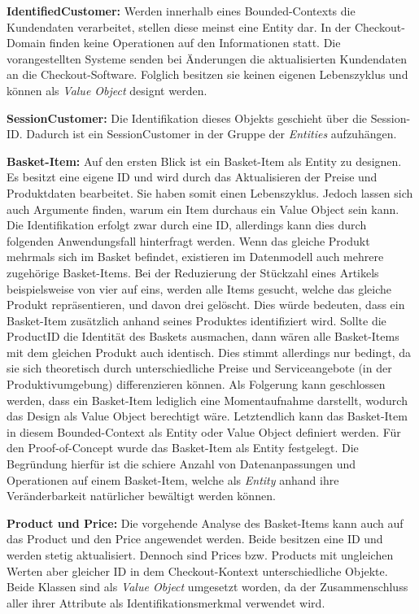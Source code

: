 \textbf{IdentifiedCustomer: } {Werden innerhalb eines Bounded-Contexts die Kundendaten verarbeitet, stellen diese meinst eine Entity dar. In der Checkout-Domain finden keine Operationen auf den Informationen statt. Die vorangestellten Systeme senden bei Änderungen die aktualisierten Kundendaten an die Checkout-Software. Folglich besitzen sie keinen eigenen Lebenszyklus und können als \emph{Value Object} designt werden.}

\textbf{SessionCustomer: } {Die Identifikation dieses Objekts geschieht über die Session-ID. Dadurch ist ein SessionCustomer in der Gruppe der \emph{Entities} aufzuhängen. }

\textbf{Basket-Item: } {Auf den ersten Blick ist ein Basket-Item als Entity zu designen. Es besitzt eine eigene ID und wird durch das Aktualisieren der Preise und Produktdaten bearbeitet. Sie haben somit einen Lebenszyklus. Jedoch lassen sich auch Argumente finden, warum ein Item durchaus ein Value Object sein kann. Die Identifikation erfolgt zwar durch eine ID, allerdings kann dies durch folgenden Anwendungsfall hinterfragt werden. Wenn das gleiche Produkt mehrmals sich im Basket befindet, existieren im Datenmodell auch mehrere zugehörige Basket-Items. Bei der Reduzierung der Stückzahl eines Artikels beispielsweise von vier auf eins, werden alle Items gesucht, welche das gleiche Produkt repräsentieren, und davon drei gelöscht. Dies würde bedeuten, dass ein Basket-Item zusätzlich anhand seines Produktes identifiziert wird. Sollte die ProductID die Identität des Baskets ausmachen, dann wären alle Basket-Items mit dem gleichen Produkt auch identisch. Dies stimmt allerdings nur bedingt, da sie sich theoretisch durch unterschiedliche Preise und Serviceangebote (in der Produktivumgebung) differenzieren können. Als Folgerung kann geschlossen werden, dass ein Basket-Item lediglich eine Momentaufnahme darstellt, wodurch das Design als Value Object berechtigt wäre. Letztendlich kann das Basket-Item in diesem Bounded-Context als Entity oder Value Object definiert werden. Für den Proof-of-Concept wurde das Basket-Item als Entity festgelegt. Die Begründung hierfür ist die schiere Anzahl von Datenanpassungen und Operationen auf einem Basket-Item, welche als \emph{Entity} anhand ihre Veränderbarkeit natürlicher bewältigt werden können.}

\textbf{Product und Price: } {Die vorgehende Analyse des Basket-Items kann auch auf das Product und den Price angewendet werden. Beide besitzen eine ID und werden stetig aktualisiert. Dennoch sind Prices bzw. Products mit ungleichen Werten aber gleicher ID in dem Checkout-Kontext unterschiedliche Objekte. Beide Klassen sind als \emph{Value Object} umgesetzt worden, da der Zusammenschluss aller ihrer Attribute als Identifikationsmerkmal verwendet wird. }

